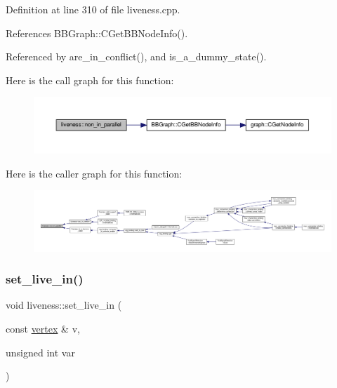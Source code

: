 Definition at line 310 of file liveness.\+cpp.



References B\+B\+Graph\+::\+C\+Get\+B\+B\+Node\+Info().



Referenced by are\+\_\+in\+\_\+conflict(), and is\+\_\+a\+\_\+dummy\+\_\+state().

Here is the call graph for this function\+:
\nopagebreak
\begin{figure}[H]
\begin{center}
\leavevmode
\includegraphics[width=350pt]{d3/d1f/classliveness_a0ff38bbfa3d6bc5a3228fe2c1bd408f7_cgraph}
\end{center}
\end{figure}
Here is the caller graph for this function\+:
\nopagebreak
\begin{figure}[H]
\begin{center}
\leavevmode
\includegraphics[width=350pt]{d3/d1f/classliveness_a0ff38bbfa3d6bc5a3228fe2c1bd408f7_icgraph}
\end{center}
\end{figure}
\mbox{\label{classliveness_a6e7f7ae85f11dc785448d459881857af}} 
\subsubsection{\texorpdfstring{set\+\_\+live\+\_\+in()}{set\_live\_in()}\hspace{0.1cm}{\footnotesize\ttfamily [1/3]}}
{\footnotesize\ttfamily void liveness\+::set\+\_\+live\+\_\+in (\begin{DoxyParamCaption}\item[{const \hyperlink{graph_8hpp_abefdcf0544e601805af44eca032cca14}{vertex} \&}]{v,  }\item[{unsigned int}]{var }\end{DoxyParamCaption})}



